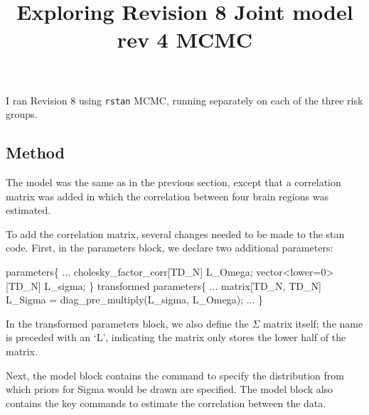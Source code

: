 \documentclass[]{article}
\title{Exploring Revision 8 Joint model rev 4 MCMC}
\author{}
\date{}
\newenvironment{Shaded}{\begin{snugshade}}{\end{snugshade}}
\newcommand{\DecValTok}[1]{\textcolor[rgb]{0.00,0.00,0.81}{{#1}}}
\newcommand{\NormalTok}[1]{{#1}}
\begin{document}
\maketitle

I ran Revision 8 using \texttt{rstan} MCMC, running separately on each
of the three risk groups.

\subsection{Method}\label{method}

The model was the same as in the previous section, except that a
correlation matrix was added in which the correlation between four brain
regions was estimated.

To add the correlation matrix, several changes needed to be made to the
stan code. First, in the parameters block, we declare two additional
parameters:

\begin{Shaded}
\begin{Highlighting}[]
\NormalTok{parameters\{}
  \NormalTok{...}
  \NormalTok{cholesky_factor_corr[TD_N] L_Omega;}
  \NormalTok{vector<lower=}\DecValTok{0}\NormalTok{>[TD_N] L_sigma;}
\NormalTok{\}}
\NormalTok{transformed parameters\{}
  \NormalTok{...}
  \NormalTok{matrix[TD_N, TD_N] L_Sigma = diag_pre_multiply(L_sigma, L_Omega);}
  \NormalTok{...}
\NormalTok{\}}
\end{Highlighting}
\end{Shaded}

In the transformed parameters block, we also define the \(\Sigma\)
matrix itself; the name is preceded with an `L', indicating the matrix
only stores the lower half of the matrix.

Next, the model block contains the command to specify the distribution
from which priors for \textbar{}Sigma\textbar{} would be drawn are
specified. The model block also contains the key commands to estimate
the correlation between the data.
\end{document}
